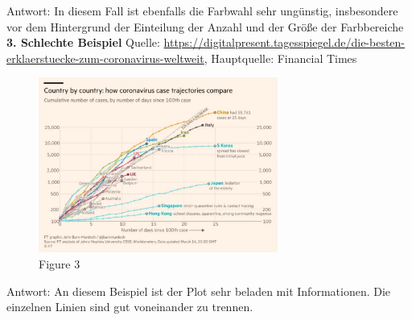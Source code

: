 \documentclass[
]{article}
\begin{document}
Antwort: In diesem Fall ist ebenfalls die Farbwahl sehr ungünstig,
insbesondere vor dem Hintergrund der Einteilung der Anzahl und der Größe
der Farbbereiche \textbf{3. Schlechte Beispiel} Quelle:
\url{https://digitalpresent.tagesspiegel.de/die-besten-erklaerstuecke-zum-coronavirus-weltweit},
Hauptquelle: Financial Times

\begin{figure}
\centering
\includegraphics[width=0.7\textwidth,height=\textheight]{figures/ft-corona.webp}
\caption{Figure 3}
\end{figure}

Antwort: An diesem Beispiel ist der Plot sehr beladen mit Informationen.
Die einzelnen Linien sind gut voneinander zu trennen.
\end{document}

